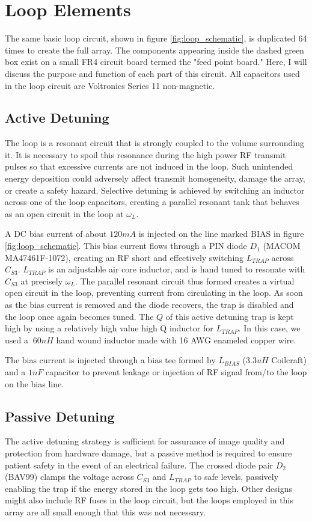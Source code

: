 \chapter{Loop Elements}

The same basic loop circuit, shown in figure \ref{fig:loop_schematic}, is duplicated 64 times to create the full array.
The components appearing inside the dashed green box exist on a small FR4 circuit board termed the "feed point board."
Here, I will discuss the purpose and function of each part of this circuit. All capacitors used in the loop circuit are
Voltronics Series 11 non-magnetic.

\section{Active Detuning}
The loop is a resonant circuit that is strongly coupled to the volume surrounding it. It is necessary to spoil this
resonance during the high power RF transmit pulses so that excessive currents are not induced in the loop. Such
unintended energy deposition could adversely affect transmit homogeneity, damage the array, or create a safety hazard.
Selective detuning is achieved by switching an inductor across one of the loop capacitors, creating a parallel
resonant tank that behaves as an open circuit in the loop at $\omega_L$.

A DC bias current of about $120mA$ is injected on the line marked BIAS in figure \ref{fig:loop_schematic}. This bias
current flows through a PIN diode $D_1$ (MACOM MA47461F-1072), creating an RF short and effectively switching $L_{TRAP}$ across $C_{S3}$.
$L_{TRAP}$ is an adjustable air core inductor, and is hand tuned to resonate with $C_{S3}$ at precisely $\omega_L$. The
parallel resonant circuit thus formed creates a virtual open circuit in the loop, preventing current from circulating in
the loop. As soon as the bias current is removed and the diode recovers, the trap is disabled and the loop once again
becomes tuned. The $Q$ of this active detuning trap is kept high by using a relatively high value high Q inductor for
$L_{TRAP}$. In this case, we used a $~60nH$ hand wound inductor made with 16 AWG enameled copper wire.

The bias current is injected through a bias tee formed by $L_{BIAS}$ ($3.3uH$ Coilcraft) and a $1nF$ capacitor to prevent leakage or
injection of RF signal from/to the loop on the bias line.

\section{Passive Detuning}
The active detuning strategy is sufficient for assurance of image quality and protection from hardware damage, but a
passive method is required to ensure patient safety in the event of an electrical failure. The crossed diode pair $D_2$
(BAV99) clamps the voltage across $C_{S3}$ and $L_{TRAP}$ to safe levels, passively enabling the trap if the energy stored in
the loop gets too high. Other designs might also include RF fuses in the loop circuit, but the loops employed in this
array are all small enough that this was not necessary.

